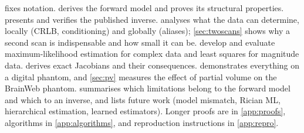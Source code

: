  fixes notation.  derives the forward model and proves
its structural properties.  presents and verifies the published inverse.
 analyses what the data can determine, locally (CRLB, conditioning)
and globally (aliases); \cref{sec:twoscans} shows why a second scan is indispensable and how
small it can be.  develop and evaluate maximum-likelihood
estimation for complex data and least squares for magnitude data. 
derives exact Jacobians and their consequences.  demonstrates everything
on a digital phantom, and \cref{sec:pv} measures the effect of partial volume on the
BrainWeb phantom.  summarises which limitations belong to the
forward model and which to an inverse, and lists future work (model mismatch, Rician ML,
hierarchical estimation, learned estimators). Longer proofs are in \cref{app:proofs},
algorithms in \cref{app:algorithms}, and reproduction instructions in \cref{app:repro}.
